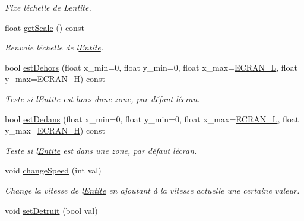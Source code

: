 \begin{DoxyCompactItemize}
\begin{DoxyCompactList}\small\item\em Fixe l\textquotesingle{}échelle de L\textquotesingle{}entite. \end{DoxyCompactList}\item 
float \mbox{\hyperlink{class_entite_a5f70868f62049291edf4b245a531a6e0}{get\+Scale}} () const
\begin{DoxyCompactList}\small\item\em Renvoie l\textquotesingle{}échelle de l\textquotesingle{}\mbox{\hyperlink{class_entite}{Entite}}. \end{DoxyCompactList}\item 
bool \mbox{\hyperlink{class_entite_a3e3abd5eac22335f388e6b31675319c1}{est\+Dehors}} (float x\+\_\+min=0, float y\+\_\+min=0, float x\+\_\+max=\mbox{\hyperlink{constantes_8h_a8958557e953d458537dedcf460f477c1}{E\+C\+R\+A\+N\+\_\+L}}, float y\+\_\+max=\mbox{\hyperlink{constantes_8h_a899c06d4fdb39f4fa51fc7158e2be2d1}{E\+C\+R\+A\+N\+\_\+H}}) const
\begin{DoxyCompactList}\small\item\em Teste si l\textquotesingle{}\mbox{\hyperlink{class_entite}{Entite}} est hors d\textquotesingle{}une zone, par défaut l\textquotesingle{}écran. \end{DoxyCompactList}\item 
bool \mbox{\hyperlink{class_entite_a0861182f1af724c8b5fd70b30720fa04}{est\+Dedans}} (float x\+\_\+min=0, float y\+\_\+min=0, float x\+\_\+max=\mbox{\hyperlink{constantes_8h_a8958557e953d458537dedcf460f477c1}{E\+C\+R\+A\+N\+\_\+L}}, float y\+\_\+max=\mbox{\hyperlink{constantes_8h_a899c06d4fdb39f4fa51fc7158e2be2d1}{E\+C\+R\+A\+N\+\_\+H}}) const
\begin{DoxyCompactList}\small\item\em Teste si l\textquotesingle{}\mbox{\hyperlink{class_entite}{Entite}} est dans une zone, par défaut l\textquotesingle{}écran. \end{DoxyCompactList}\item 
void \mbox{\hyperlink{class_entite_abd20483e4d51bc7ebb0eb58bb4366757}{change\+Speed}} (int val)
\begin{DoxyCompactList}\small\item\em Change la vitesse de l\textquotesingle{}\mbox{\hyperlink{class_entite}{Entite}} en ajoutant à la vitesse actuelle une certaine valeur. \end{DoxyCompactList}\item 
void \mbox{\hyperlink{class_entite_a4b0ce40a2427f44978728dbae9560fee}{set\+Detruit}} (bool val)

\end{DoxyCompactItemize}
